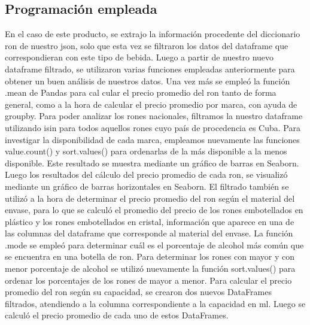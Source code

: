 \documentclass[a4paper,12pt]{article}
\begin{document}
		\subsection{Programación empleada}
		En el caso de este producto, se extrajo la información procedente del diccionario ron de nuestro json, solo que esta vez se filtraron los datos del dataframe que correspondieran con este tipo de bebida. Luego a partir de nuestro nuevo dataframe filtrado, se utilizaron varias funciones empleadas anteriormente para obtener un buen análisis de nuestros datos. Una vez más se empleó la función .mean de Pandas para cal cular el precio promedio del ron tanto de forma general, como a la hora de calcular el precio promedio por marca, con ayuda de groupby. Para poder analizar los rones nacionales, filtramos la nuestro dataframe utilizando isin para todos aquellos rones cuyo país de procedencia es Cuba. Para investigar la disponibilidad de cada marca, empleamos nuevamente las funciones value.count() y sort.values() para ordenarlas de la más disponible a la menos disponible. Este resultado se muestra mediante un gráfico de barras en Seaborn. Luego los resultados del cálculo del precio promedio de cada ron, se visualizó mediante un gráfico de barras horizontales en Seaborn. El filtrado también se utilizó a la hora de determinar el precio promedio del ron según el material del envase, para lo que se calculó el promedio del precio de los rones embotellados en plástico y los rones embotellados en cristal, información que aparece en una de las columnas del dataframe que corresponde al material del envase. La función .mode se empleó para determinar cuál es el porcentaje de alcohol más común que se encuentra en una botella de ron. Para determinar los rones con mayor y con menor porcentaje de alcohol se utilizó nuevamente la función sort.values() para ordenar los porcentajes de los rones de mayor a menor. Para calcular el precio promedio del ron según su capacidad, se crearon dos nuevos DataFrames filtrados, atendiendo a la columna correspondiente a la capacidad en ml. Luego se calculó el precio promedio de cada uno de estos DataFrames.
\end{document}
